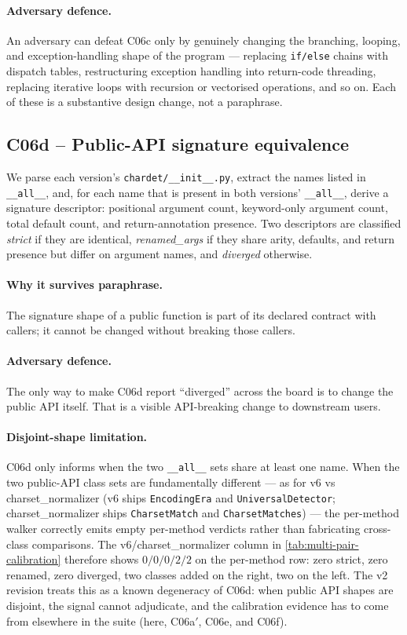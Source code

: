\documentclass[11pt,letterpaper]{article}
\begin{document}
\paragraph{Adversary defence.} An adversary can defeat C06c only by
genuinely changing the branching, looping, and exception-handling
shape of the program --- replacing \texttt{if/else} chains with
dispatch tables, restructuring exception handling into return-code
threading, replacing iterative loops with recursion or vectorised
operations, and so on. Each of these is a substantive design
change, not a paraphrase.

\subsection{C06d -- Public-API signature equivalence}
\label{sec:c06d}
We parse each version's \texttt{chardet/\_\_init\_\_.py}, extract
the names listed in \texttt{\_\_all\_\_}, and, for each name that is
present in both versions' \texttt{\_\_all\_\_}, derive a signature
descriptor: positional argument count, keyword-only argument count,
total default count, and return-annotation presence. Two descriptors
are classified \emph{strict} if they are identical, \emph{renamed\_args}
if they share arity, defaults, and return presence but differ on
argument names, and \emph{diverged} otherwise.

\paragraph{Why it survives paraphrase.} The signature shape of a
public function is part of its declared contract with callers; it
cannot be changed without breaking those callers.

\paragraph{Adversary defence.} The only way to make C06d report
``diverged'' across the board is to change the public API itself.
That is a visible API-breaking change to downstream users.

\paragraph{Disjoint-shape limitation.} C06d only informs when the two
\texttt{\_\_all\_\_} sets share at least one name. When the two
public-API class sets are fundamentally different --- as for v6 vs
charset\_normalizer (v6 ships \texttt{EncodingEra} and
\texttt{UniversalDetector}; charset\_normalizer ships
\texttt{CharsetMatch} and \texttt{CharsetMatches}) --- the per-method
walker correctly emits empty per-method verdicts rather than
fabricating cross-class comparisons. The v6/charset\_normalizer
column in \cref{tab:multi-pair-calibration} therefore shows
$0/0/0/2/2$ on the per-method row: zero strict, zero renamed, zero
diverged, two classes added on the right, two on the left. The
v2 revision treats this as a known degeneracy of C06d: when public
API shapes are disjoint, the signal cannot adjudicate, and the
calibration evidence has to come from elsewhere in the suite (here,
C06a$'$, C06e, and C06f).
\end{document}
